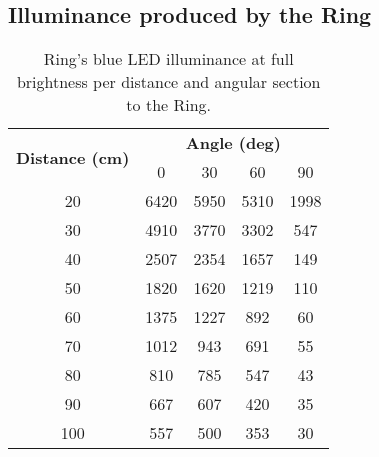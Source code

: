 \subsection{Illuminance produced by the Ring}
\begin{table}[h!]
	\centering
	\caption{Ring's blue LED illuminance at full brightness per distance and angular section to the Ring.}
	\label{table:illuminance_blue}
	\begin{tabular}{ccccc}
		\hline
		\hline
		\toprule
		\multirow{2}{*}{\textbf{Distance (cm)}} & \multicolumn{4}{c}{\textbf{Angle (deg)}}\\
		& 0 & 30 & 60 & 90 \\
		\bottomrule
		\toprule
		20    &    6420    &    5950    &    5310    &    1998    \\
		30    &    4910    &    3770    &    3302    &    547        \\
		40    &    2507    &    2354    &    1657    &    149        \\
		50    &    1820    &    1620    &    1219    &    110        \\
		60    &    1375    &    1227    &    892        &    60        \\
		70    &    1012    &    943        &    691        &    55        \\
		80    &    810        &    785        &    547        &    43        \\
		90    &    667        &    607        &    420        &    35        \\
		100    &    557        &    500        &    353        &    30        \\
		\bottomrule
		\hline
		\hline
	\end{tabular}
\end{table}
